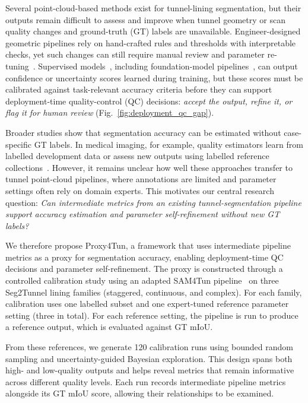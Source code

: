 \documentclass[a4paper,fleqn]{cas-dc}
\begin{document}
Several point-cloud-based methods exist for tunnel-lining segmentation, but their outputs remain difficult to assess and improve when tunnel geometry or scan quality changes and ground-truth (GT) labels are unavailable. Engineer-designed geometric pipelines rely on hand-crafted rules and thresholds with interpretable checks, yet such changes can still require manual review and parameter re-tuning~\cite{huang2021bim,weidner2024generalized,wang2025automated}. Supervised models~\cite{su2024review,cha2024deep}, including foundation-model pipelines~\cite{bommasani2021foundation,kirillov2023sam,ye2024sam}, can output confidence or uncertainty scores learned during training, but these scores must be calibrated against task-relevant accuracy criteria before they can support deployment-time quality-control (QC) decisions: \textit{accept the output, refine it, or flag it for human review} (Fig.~\ref{fig:deployment_qc_gap}).

Broader studies show that segmentation accuracy can be estimated without case-specific GT labels. In medical imaging, for example, quality estimators learn from labelled development data or assess new outputs using labelled reference collections~\cite{valindria2017rca,robinson2018segmentationQuality,fournel2021segmentationQC}. However, it remains unclear how well these approaches transfer to tunnel point-cloud pipelines, where annotations are limited and parameter settings often rely on domain experts. This motivates our central research question: \emph{Can intermediate metrics from an existing tunnel-segmentation pipeline support accuracy estimation and parameter self-refinement without new GT labels?}

We therefore propose Proxy4Tun, a framework that uses intermediate pipeline metrics as a proxy for segmentation accuracy, enabling deployment-time QC decisions and parameter self-refinement. The proxy is constructed through a controlled calibration study using an adapted SAM4Tun pipeline~\cite{ye2025sam4tun} on three Seg2Tunnel lining families (staggered, continuous, and complex). For each family, calibration uses one labelled subset and one expert-tuned reference parameter setting (three in total). For each reference setting, the pipeline is run to produce a reference output, which is evaluated against GT mIoU.

From these references, we generate 120 calibration runs using bounded random sampling and uncertainty-guided Bayesian exploration. This design spans both high- and low-quality outputs and helps reveal metrics that remain informative across different quality levels. Each run records intermediate pipeline metrics alongside its GT mIoU score, allowing their relationships to be examined.
\end{document}

